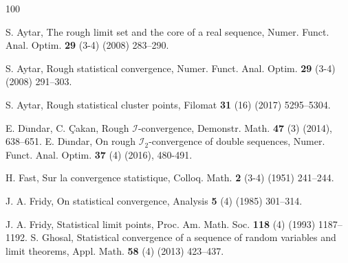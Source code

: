 \documentclass[reqno]{amsart}
\begin{document}
	
		\begin{thebibliography}{100}
		
		\large
		
		
		
		 S. Aytar, The rough limit set and the core of a real sequence,  Numer. Funct. Anal. Optim. {\textbf{29}} (3-4) (2008) {283--290}.
		
		 S. Aytar, Rough statistical convergence, Numer. Funct. Anal. Optim. {\textbf{29}} (3-4) (2008) {291--303}.
		
		  S. Aytar, Rough statistical cluster points, Filomat {\textbf{31}} (16) (2017) {5295--5304}. 
		
		
		 E. D$\ddot{\mbox{u}}$ndar, C. {\c{C}}akan, Rough $\mathcal{I}$-convergence, Demonstr. Math. \textbf{47} (3) (2014), {638--651}.
		  E. D$\ddot{\mbox{u}}$ndar,  On rough $\mathcal{I}_2$-convergence of double sequences, Numer. Funct. Anal. Optim. \textbf{37} (4) (2016), 480-491.
		
		
		
		 H. Fast, Sur la convergence statistique, Colloq. Math. {\textbf{2}} (3-4) (1951) {241--244}.
		
		
		 J. A. Fridy, On statistical convergence, Analysis {\textbf{5}} (4) (1985) {301--314}.
		
		  J. A. Fridy, Statistical limit points,  Proc. Am. Math. Soc. {\textbf{118}} (4) (1993) {1187--1192}.
		 S. Ghosal, Statistical convergence of a sequence of random variables and limit theorems, Appl. Math. \textbf{58} (4) (2013) {423--437}.
		

\end{thebibliography}
\end{document}
